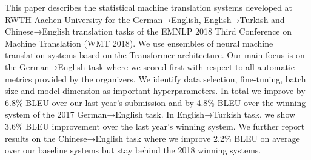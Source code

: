 This paper describes the statistical machine translation systems developed at RWTH Aachen University for the German→English, English→Turkish and Chinese→English translation tasks of the EMNLP 2018 Third Conference on Machine Translation (WMT 2018). We use ensembles of neural machine translation systems based on the Transformer architecture. Our main focus is on the German→English task where we scored first with respect to all automatic metrics provided by the organizers. We identify data selection, fine-tuning, batch size and model dimension as important hyperparameters. In total we improve by 6.8\% BLEU over our last year's submission and by 4.8\% BLEU over the winning system of the 2017 German→English task. In English→Turkish task, we show 3.6\% BLEU improvement over the last year's winning system. We further report results on the Chinese→English task where we improve 2.2\% BLEU on average over our baseline systems but stay behind the 2018 winning systems.
